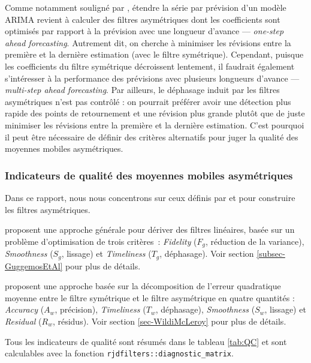 \documentclass[
  11pt,
  french,
  a4paper]{article}
\newcommand\1{\mathds{1}}
\begin{document}
Comme notamment souligné par \textcite{wildischis2004}, étendre la série par prévision d'un modèle ARIMA revient à calculer des filtres asymétriques dont les coefficients sont optimisés par rapport à la prévision avec une longueur d'avance --- \emph{one-step ahead forecasting}.
Autrement dit, on cherche à minimiser les révisions entre la première et la dernière estimation (avec le filtre symétrique).
Cependant, puisque les coefficients du filtre symétrique décroissent lentement, il faudrait également s'intéresser à la performance des prévisions avec plusieurs longueurs d'avance --- \emph{multi-step ahead forecasting}.
Par ailleurs, le déphasage induit par les filtres asymétriques n'est pas contrôlé : on pourrait préférer avoir une détection plus rapide des points de retournement et une révision plus grande plutôt que de juste minimiser les révisions entre la première et la dernière estimation.
C'est pourquoi il peut être nécessaire de définir des critères alternatifs pour juger la qualité des moyennes mobiles asymétriques.

\hypertarget{indicateurs-de-qualituxe9-des-moyennes-mobiles-asymuxe9triques}{%
\subsubsection{Indicateurs de qualité des moyennes mobiles asymétriques}\label{indicateurs-de-qualituxe9-des-moyennes-mobiles-asymuxe9triques}}

Dans ce rapport, nous nous concentrons sur ceux définis par \textcite{ch15HBSA} et \textcite{trilemmaWMR2019} pour construire les filtres asymétriques.

\textcite{ch15HBSA} proposent une approche générale pour dériver des filtres linéaires, basée sur un problème d'optimisation de trois critères~: \emph{Fidelity} (\(F_g\), réduction de la variance), \emph{Smoothness} (\(S_g\), lissage) et \emph{Timeliness} (\(T_g\), déphasage).
Voir section \ref{subsec-GuggemosEtAl} pour plus de détails.

\textcite{trilemmaWMR2019} proposent une approche basée sur la décomposition de l'erreur quadratique moyenne entre le filtre symétrique et le filtre asymétrique en quatre quantités : \emph{Accuracy} (\(A_w\), précision), \emph{Timeliness} (\(T_w\), déphasage), \emph{Smoothness} (\(S_w\), lissage) et \emph{Residual} (\(R_w\), résidus).
Voir section \ref{sec-WildiMcLeroy} pour plus de détails.

Tous les indicateurs de qualité sont résumés dans le tableau \ref{tab:QC} et sont calculables avec la fonction \texttt{rjdfilters::diagnostic\_matrix}.
\end{document}
